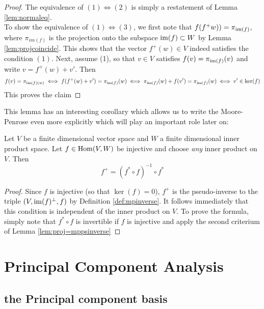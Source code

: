 \documentclass{dsp}
\begin{document}
\begin{proof}
	The equivalence of $(1)\iff (2)$ is simply a restatement of Lemma \ref{lem:normaleq}.\\
	To show the equivalence of $(1)\iff (3)$, we first note that $f(f^+w))=\pi_{\operatorname{im}(f)}$, where $\pi_{im(f)}$ is the projection onto the subspace $\operatorname{im}(f)\subset W$ by Lemma \ref{lem:projcoincide}. This shows that the vector $f^+(w) \in V$ indeed satisfies the condition $(1)$. Next, assume (1), so that $v \in V$ satisfies $f(v)=\pi_{\operatorname{im}(f)}(v)$ and write $v= f^+(w)+v'$. Then\[
	f(v)=\pi_{\operatorname{im}(f)(w)}\iff f(f^+(w)+v')=\pi_{\operatorname{im}(f)}(w)\iff \pi_{\operatorname{im}(f)}(w)+f(v')=\pi_{\operatorname{im}(f)}(w)\iff v'\in \ker(f)
	\]
	This proves the claim
\end{proof}

This lemma has an interesting corollary which allows us to write the Moore-Penrose even more explicitly which will play an important role later on:

\begin{corollary}\label{cor:psinverse-injective}
Let $V$ be a finite dimensional vector space and $W$ a finite dimensional inner product space. Let $f \in \operatorname{Hom}(V,W)$ be injective and choose \emph{any} inner product on $V$. Then
\[
f^+ = (f^*\circ f)^{-1}\circ f^*
\] 
\end{corollary}

\begin{proof}
	Since $f$ is injective (so that $\ker(f)=0$), $f^+$ is the pseudo-inverse to the triple $(V,\operatorname{im}(f)^{\perp},f)$ by Definition \ref{def:mpinverse}. It follows immediately that this condition is independent of the inner product on $V$. To prove the formula, simply note that $f^*\circ f$ is invertible if $f$ is injective and apply the second criterium of Lemma \ref{lem:proj=mppsinverse}
\end{proof}


\section{Principal Component Analysis}
\label{section:principal_component_analysis}

\subsection{the Principal component basis}
\label{subsection:pc_basis}
\end{document}
